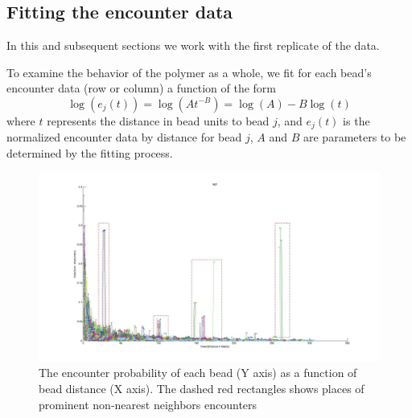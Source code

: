 \documentclass[12pt]{book}
\begin{document}
\subsection{Fitting the encounter data}
In this and subsequent sections we work with the first replicate of the data.

To examine the behavior of the polymer as a whole, we fit for each bead's encounter data 
(row or column) a function of the form 
\begin{equation}\label{fitModel}
\log(e_j(t))= \log(At^{-B})= \log(A)-B\log(t)
\end{equation}
where $t$ represents the distance in bead units to bead $j$, and $e_j(t)$ is the normalized encounter data by distance for bead $j$, $A$ and $B$ are parameters to be determined by the fitting process. 

\begin{figure}[H]
\includegraphics*[scale=0.2]{EncounterFrequenciesByDistanceRep1}
\caption{\scriptsize{The encounter probability of each bead (Y axis) as a function of bead distance (X axis). The dashed red rectangles shows places of prominent non-nearest neighbors encounters}}
\end{figure}
\end{document}
